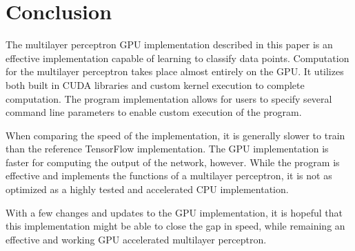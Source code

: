 \documentclass[jair, twoside,11pt,theapa]{article}
\begin{document}


\section{Conclusion}
\label{Conclusion}
The multilayer perceptron GPU implementation described in this paper is an effective implementation capable of learning to classify data points. 
Computation for the multilayer perceptron takes place almost entirely on the GPU. 
It utilizes both built in CUDA libraries and custom kernel execution to complete computation. 
The program implementation allows for users to specify several command line parameters to enable custom execution of the program. 

When comparing the speed of the implementation, it is generally slower to train than the reference TensorFlow implementation.
The GPU implementation is faster for computing the output of the network, however. 
While the program is effective and implements the functions of a multilayer perceptron, it is not as optimized as a highly tested and accelerated CPU implementation. 

With a few changes and updates to the GPU implementation, it is hopeful that this implementation might be able to close the gap in speed, while remaining an effective and working GPU accelerated multilayer perceptron. 

\vskip 0.2in


\end{document}

